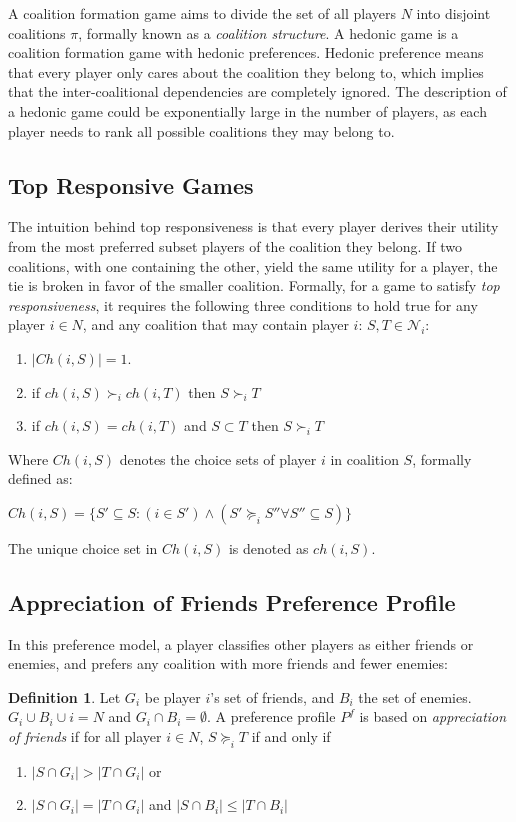\documentclass[letterpaper]{article} %
\theoremstyle{definition}
\newtheorem{definition}[theorem]{Definition}
\begin{document}
A coalition formation game aims to divide the set of all players $N$ into disjoint coalitions $\pi$, formally known as a {\it coalition structure}. A hedonic game is a coalition formation game with hedonic preferences. 
Hedonic preference means that every player only cares about the coalition they belong to, which implies that the inter-coalitional dependencies are completely ignored. The description of a hedonic game could be exponentially large in the number of players, as each player needs to rank all possible coalitions they may belong to.

\subsection{Top Responsive Games}

The intuition behind top responsiveness is that every player derives their utility from the most preferred subset players of the coalition they belong. If two coalitions, with one containing the other, yield the same utility for a player, the tie is broken in favor of the smaller coalition. Formally, for a game to satisfy {\it top responsiveness}, it requires the following three conditions to hold true for any player $i \in N$, and any coalition that may contain player $i$: $S, T \in \mathcal{N}_i$:
\begin{enumerate}
  \item $|Ch(i, S)| = 1$.
  \item if $ch(i, S) \succ_i ch(i, T)$ then $S \succ_i T$
  \item if $ch(i, S) = ch(i, T)$ and $S \subset T$ then $S \succ_i T$
\end{enumerate}

Where $Ch(i, S)$ denotes the choice sets of player $i$ in coalition $S$, formally defined as:

$Ch(i, S) = \{S' \subseteq S: (i \in S') \wedge (S' \succeq_i S'' \forall S'' \subseteq S)\}$

The unique choice set in $Ch(i, S)$ is denoted as $ch(i, S)$.

\subsection{Appreciation of Friends Preference Profile}

In this preference model, a player classifies other players as either friends or enemies, and prefers any coalition with more friends and fewer enemies:

\begin{definition}
  Let $G_i$ be player $i$'s set of friends, and $B_i$ the set of enemies. $G_i \cup B_i \cup i = N$ and $G_i \cap B_i = \emptyset$. A preference profile $P^f$ is based on {\it appreciation of friends} if for all player $i \in N$, $S \succeq_i T$ if and only if

\begin{enumerate}
  \item $|S \cap G_i| > |T \cap G_i|$ or
  \item $|S \cap G_i| = |T \cap G_i|$ and $|S \cap B_i| \leq |T \cap B_i|$
\end{enumerate}
\end{definition}
\end{document}
